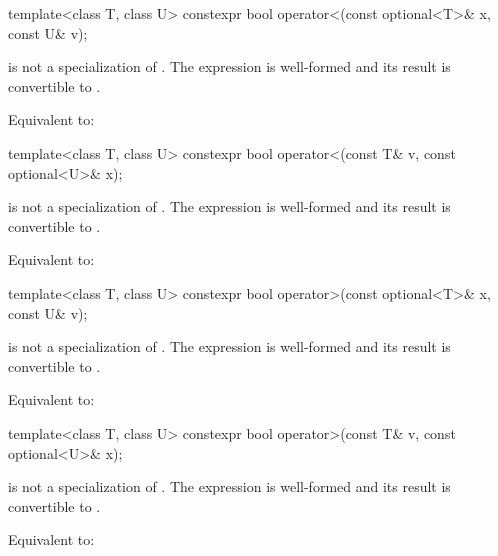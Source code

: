 %
\begin{itemdecl}
template<class T, class U> constexpr bool operator<(const optional<T>& x, const U& v);
\end{itemdecl}

\begin{itemdescr}
\pnum
\constraints
{} is not a specialization of .
The expression  is well-formed and
its result is convertible to .

\pnum
\effects
Equivalent to: 
\end{itemdescr}

%
\begin{itemdecl}
template<class T, class U> constexpr bool operator<(const T& v, const optional<U>& x);
\end{itemdecl}

\begin{itemdescr}
\pnum
\constraints
{} is not a specialization of .
The expression  is well-formed and
its result is convertible to .

\pnum
\effects
Equivalent to: 
\end{itemdescr}

%
\begin{itemdecl}
template<class T, class U> constexpr bool operator>(const optional<T>& x, const U& v);
\end{itemdecl}

\begin{itemdescr}
\pnum
\constraints
{} is not a specialization of .
The expression  is well-formed and
its result is convertible to .

\pnum
\effects
Equivalent to: 
\end{itemdescr}

%
\begin{itemdecl}
template<class T, class U> constexpr bool operator>(const T& v, const optional<U>& x);
\end{itemdecl}

\begin{itemdescr}
\pnum
\constraints
{} is not a specialization of .
The expression  is well-formed and
its result is convertible to .

\pnum
\effects
Equivalent to: 
\end{itemdescr}

